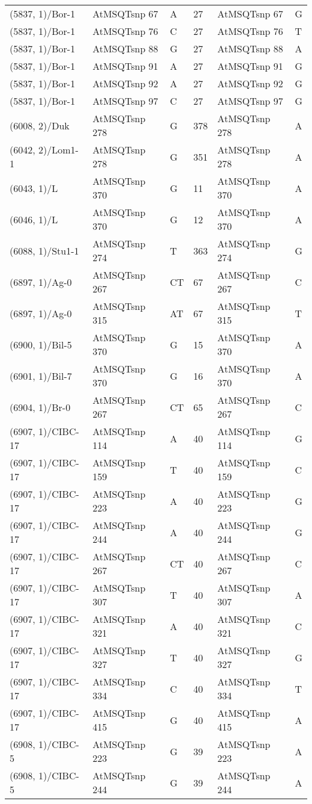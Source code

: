 \begin{center}
\begin{longtable}{|l|l|l|l|l|l|}
(5837, 1)/Bor-1&AtMSQTsnp 67&A&27&AtMSQTsnp 67&G\\
(5837, 1)/Bor-1&AtMSQTsnp 76&C&27&AtMSQTsnp 76&T\\
(5837, 1)/Bor-1&AtMSQTsnp 88&G&27&AtMSQTsnp 88&A\\
(5837, 1)/Bor-1&AtMSQTsnp 91&A&27&AtMSQTsnp 91&G\\
(5837, 1)/Bor-1&AtMSQTsnp 92&A&27&AtMSQTsnp 92&G\\
(5837, 1)/Bor-1&AtMSQTsnp 97&C&27&AtMSQTsnp 97&G\\
(6008, 2)/Duk&AtMSQTsnp 278&G&378&AtMSQTsnp 278&A\\
(6042, 2)/Lom1-1&AtMSQTsnp 278&G&351&AtMSQTsnp 278&A\\
(6043, 1)/L&AtMSQTsnp 370&G&11&AtMSQTsnp 370&A\\
(6046, 1)/L&AtMSQTsnp 370&G&12&AtMSQTsnp 370&A\\
(6088, 1)/Stu1-1&AtMSQTsnp 274&T&363&AtMSQTsnp 274&G\\
(6897, 1)/Ag-0&AtMSQTsnp 267&CT&67&AtMSQTsnp 267&C\\
(6897, 1)/Ag-0&AtMSQTsnp 315&AT&67&AtMSQTsnp 315&T\\
(6900, 1)/Bil-5&AtMSQTsnp 370&G&15&AtMSQTsnp 370&A\\
(6901, 1)/Bil-7&AtMSQTsnp 370&G&16&AtMSQTsnp 370&A\\
(6904, 1)/Br-0&AtMSQTsnp 267&CT&65&AtMSQTsnp 267&C\\
(6907, 1)/CIBC-17&AtMSQTsnp 114&A&40&AtMSQTsnp 114&G\\
(6907, 1)/CIBC-17&AtMSQTsnp 159&T&40&AtMSQTsnp 159&C\\
(6907, 1)/CIBC-17&AtMSQTsnp 223&A&40&AtMSQTsnp 223&G\\
(6907, 1)/CIBC-17&AtMSQTsnp 244&A&40&AtMSQTsnp 244&G\\
(6907, 1)/CIBC-17&AtMSQTsnp 267&CT&40&AtMSQTsnp 267&C\\
(6907, 1)/CIBC-17&AtMSQTsnp 307&T&40&AtMSQTsnp 307&A\\
(6907, 1)/CIBC-17&AtMSQTsnp 321&A&40&AtMSQTsnp 321&C\\
(6907, 1)/CIBC-17&AtMSQTsnp 327&T&40&AtMSQTsnp 327&G\\
(6907, 1)/CIBC-17&AtMSQTsnp 334&C&40&AtMSQTsnp 334&T\\
(6907, 1)/CIBC-17&AtMSQTsnp 415&G&40&AtMSQTsnp 415&A\\
(6908, 1)/CIBC-5&AtMSQTsnp 223&G&39&AtMSQTsnp 223&A\\
(6908, 1)/CIBC-5&AtMSQTsnp 244&G&39&AtMSQTsnp 244&A\\

\end{longtable}
\end{center}
